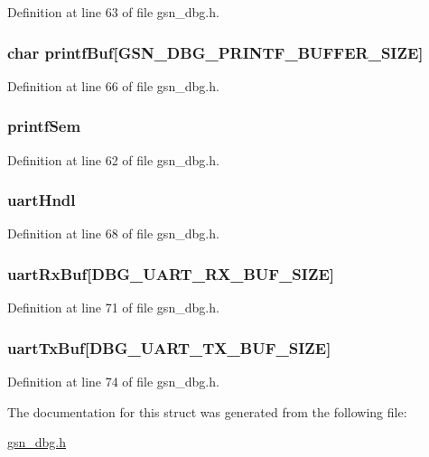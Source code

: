 Definition at line 63 of file gsn\_\-dbg.h.

\hypertarget{a00042_a5ac37032264aab467131d22bf7f6da1f}{
\subsubsection[{printfBuf}]{\setlength{\rightskip}{0pt plus 5cm}char {\bf printfBuf}\mbox{[}GSN\_\-DBG\_\-PRINTF\_\-BUFFER\_\-SIZE\mbox{]}}}
\label{a00042_a5ac37032264aab467131d22bf7f6da1f}


Definition at line 66 of file gsn\_\-dbg.h.

\hypertarget{a00042_a6ecc33e0b8c5c76e6e5506aa5b12f527}{
\subsubsection[{printfSem}]{ {\bf printfSem}}}
\label{a00042_a6ecc33e0b8c5c76e6e5506aa5b12f527}


Definition at line 62 of file gsn\_\-dbg.h.

\hypertarget{a00042_a7b9cba8523e2516fd8f1d61bf8fe72cf}{
\subsubsection[{uartHndl}]{ {\bf uartHndl}}}
\label{a00042_a7b9cba8523e2516fd8f1d61bf8fe72cf}


Definition at line 68 of file gsn\_\-dbg.h.

\hypertarget{a00042_af14e7b30aac2fa083e94f08dd133640a}{
\subsubsection[{uartRxBuf}]{ {\bf uartRxBuf}\mbox{[}DBG\_\-UART\_\-RX\_\-BUF\_\-SIZE\mbox{]}}}
\label{a00042_af14e7b30aac2fa083e94f08dd133640a}


Definition at line 71 of file gsn\_\-dbg.h.

\hypertarget{a00042_ac0b6a8b78963ea17376effd95a0014b4}{
\subsubsection[{uartTxBuf}]{ {\bf uartTxBuf}\mbox{[}DBG\_\-UART\_\-TX\_\-BUF\_\-SIZE\mbox{]}}}
\label{a00042_ac0b6a8b78963ea17376effd95a0014b4}


Definition at line 74 of file gsn\_\-dbg.h.



The documentation for this struct was generated from the following file:\begin{DoxyCompactItemize}
\item 
\hyperlink{a00480}{gsn\_\-dbg.h}\end{DoxyCompactItemize}
